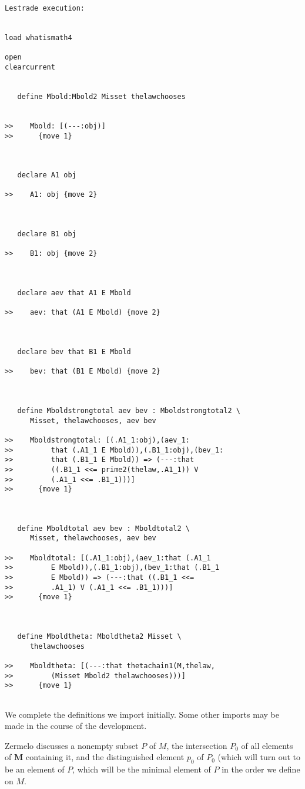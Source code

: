 \documentclass[12pt]{article}
\begin{document}
\begin{verbatim}Lestrade execution:


load whatismath4

open
clearcurrent


   define Mbold:Mbold2 Misset thelawchooses


>>    Mbold: [(---:obj)]
>>      {move 1}



   declare A1 obj

>>    A1: obj {move 2}



   declare B1 obj

>>    B1: obj {move 2}



   declare aev that A1 E Mbold

>>    aev: that (A1 E Mbold) {move 2}



   declare bev that B1 E Mbold

>>    bev: that (B1 E Mbold) {move 2}



   define Mboldstrongtotal aev bev : Mboldstrongtotal2 \
      Misset, thelawchooses, aev bev

>>    Mboldstrongtotal: [(.A1_1:obj),(aev_1:
>>         that (.A1_1 E Mbold)),(.B1_1:obj),(bev_1:
>>         that (.B1_1 E Mbold)) => (---:that
>>         ((.B1_1 <<= prime2(thelaw,.A1_1)) V
>>         (.A1_1 <<= .B1_1)))]
>>      {move 1}



   define Mboldtotal aev bev : Mboldtotal2 \
      Misset, thelawchooses, aev bev

>>    Mboldtotal: [(.A1_1:obj),(aev_1:that (.A1_1
>>         E Mbold)),(.B1_1:obj),(bev_1:that (.B1_1
>>         E Mbold)) => (---:that ((.B1_1 <<=
>>         .A1_1) V (.A1_1 <<= .B1_1)))]
>>      {move 1}



   define Mboldtheta: Mboldtheta2 Misset \
      thelawchooses

>>    Mboldtheta: [(---:that thetachain1(M,thelaw,
>>         (Misset Mbold2 thelawchooses)))]
>>      {move 1}


\end{verbatim}

We complete the definitions we import initially.  Some other imports may be made in the course of the development.

Zermelo discusses a nonempty subset $P$ of $M$, the intersection $P_0$ of all elements of {\bf M} containing it, and the distinguished element $p_0$ of $P_0$ (which will turn out to be an element of $P$, which will be the minimal element of $P$ in the order we define on $M$.
\end{document}
